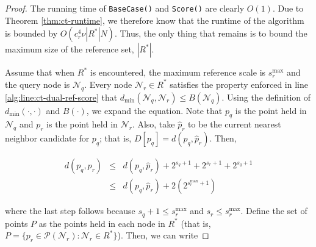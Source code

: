 \begin{proof}
The running time of \texttt{BaseCase()} and \texttt{Score()} are clearly $O(1)$.
Due to Theorem \ref{thm:ct-runtime}, we therefore know that the runtime of the
algorithm is bounded by $O(c_r^4 \nu |R^*| N)$.  Thus, the only thing that
remains is to bound the maximum size of the reference set, $|R^*|$.

Assume that when $R^*$ is encountered, the maximum reference scale is
$s_r^{\max}$ and the query node is $\mathscr{N}_q$.  Every node $\mathscr{N}_r
\in R^*$ satisfies the property enforced in line
\ref{alg:line:ct-dual-ref-score} that
$d_{\min}(\mathscr{N}_q, \mathscr{N}_r) \le B(\mathscr{N}_q)$.
Using the definition of $d_{\min}(\cdot, \cdot)$ and $B(\cdot)$, we
expand the equation.  Note that $p_q$ is the point held in $\mathscr{N}_q$ and
$p_r$ is the point held in $\mathscr{N}_r$.  Also, take $\hat{p}_r$ to be the
current nearest neighbor candidate for $p_q$; that is, $D[p_q] = d(p_q,
\hat{p}_r)$.  Then,

\begin{eqnarray}
d(p_q, p_r) &\le& d(p_q, \hat{p}_r) + 2^{s_q + 1} + 2^{s_r + 1} + 2^{s_q + 1}
\label{eqn:pr_dist} \\
 &\le& d(p_q, \hat{p}_r) + 2(2^{s_r^{\max} + 1})
\end{eqnarray}

\noindent where the last step follows because $s_q + 1 \le s_r^{\max}$ and $s_r
\le s_r^{\max}$.  Define the set of points $P$ as the points held in each node
in $R^*$ (that is, $P = \{ p_r \in \mathscr{P}(\mathscr{N}_r) : \mathscr{N}_r
\in R^* \}$).  Then, we can write

%


\end{proof}
